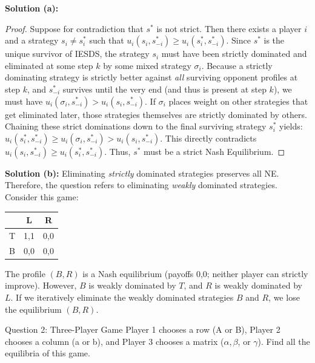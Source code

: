 \documentclass[12pt, a4paper]{article}
\begin{document}
\textbf{Solution (a):}
\begin{proof}
Suppose for contradiction that $s^*$ is not strict. Then there exists a player $i$ and a strategy $s_i \neq s_i^*$ such that $u_i(s_i, s_{-i}^*) \geq u_i(s_i^*, s_{-i}^*)$. 
Since $s^*$ is the unique survivor of IESDS, the strategy $s_i$ must have been strictly dominated and eliminated at some step $k$ by some mixed strategy $\sigma_i$. 
Because a strictly dominating strategy is strictly better against \textit{all} surviving opponent profiles at step $k$, and $s_{-i}^*$ survives until the very end (and thus is present at step $k$), we must have $u_i(\sigma_i, s_{-i}^*) > u_i(s_i, s_{-i}^*)$.
If $\sigma_i$ places weight on other strategies that get eliminated later, those strategies themselves are strictly dominated by others. Chaining these strict dominations down to the final surviving strategy $s_i^*$ yields:
$u_i(s_i^*, s_{-i}^*) \geq u_i(\sigma_i, s_{-i}^*) > u_i(s_i, s_{-i}^*)$.
This directly contradicts $u_i(s_i, s_{-i}^*) \geq u_i(s_i^*, s_{-i}^*)$. Thus, $s^*$ must be a strict Nash Equilibrium.
\end{proof}

\textbf{Solution (b):}
Eliminating \textit{strictly} dominated strategies preserves all NE. Therefore, the question refers to eliminating \textit{weakly} dominated strategies. Consider this game:
\begin{center}
\renewcommand{\arraystretch}{1.2}
\begin{tabular}{c|cc}
  & L & R \\
\hline
T & 1,1 & 0,0 \\
B & 0,0 & 0,0 \\
\end{tabular}
\end{center}
The profile $(B,R)$ is a Nash equilibrium (payoffs 0,0; neither player can strictly improve). However, $B$ is weakly dominated by $T$, and $R$ is weakly dominated by $L$. If we iteratively eliminate the weakly dominated strategies $B$ and $R$, we lose the equilibrium $(B,R)$.

\vspace{0.5cm}
\begin{exbox}{Question 2: Three-Player Game}
Player 1 chooses a row (A or B), Player 2 chooses a column (a or b), and Player 3 chooses a matrix ($\alpha, \beta$, or $\gamma$). Find all the equilibria of this game.
\end{exbox}
\end{document}
